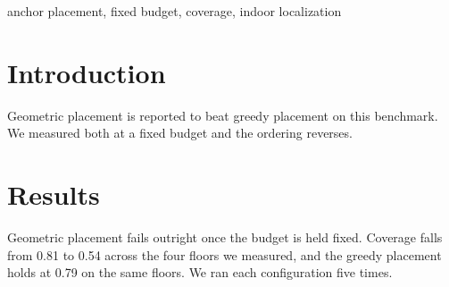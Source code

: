 \begin{IEEEkeywords}
anchor placement, fixed budget, coverage, indoor localization
\end{IEEEkeywords}

\section{Introduction}
\label{sec:intro}

Geometric placement is reported to beat greedy placement on this benchmark.
We measured both at a fixed budget and the ordering reverses.

\section{Results}
\label{sec:results}

Geometric placement fails outright once the budget is held fixed. Coverage
falls from 0.81 to 0.54 across the four floors we measured, and the greedy
placement holds at 0.79 on the same floors. We ran each configuration five
times.


